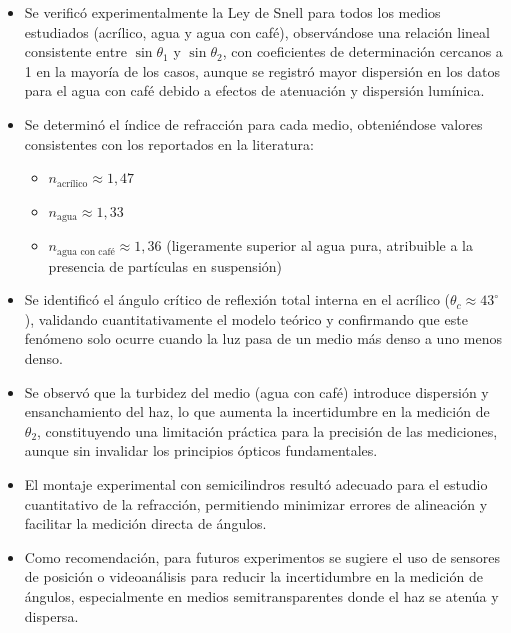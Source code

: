 \documentclass[11pt,twocolumn]{article}
\begin{document}
\begin{itemize}
    \item Se verificó experimentalmente la Ley de Snell para todos los medios estudiados (acrílico, agua y agua con café), observándose una relación lineal consistente entre $\sin\theta_1$ y $\sin\theta_2$, con coeficientes de determinación cercanos a 1 en la mayoría de los casos, aunque se registró mayor dispersión en los datos para el agua con café debido a efectos de atenuación y dispersión lumínica.

    \item Se determinó el índice de refracción para cada medio, obteniéndose valores consistentes con los reportados en la literatura:
    \begin{itemize}
        \item $n_{\text{acrílico}} \approx 1,47$
        \item $n_{\text{agua}} \approx 1,33$ 
        \item $n_{\text{agua con café}} \approx 1,36$ (ligeramente superior al agua pura, atribuible a la presencia de partículas en suspensión)
    \end{itemize}

    \item Se identificó el ángulo crítico de reflexión total interna en el acrílico ($\theta_c \approx 43^\circ$), validando cuantitativamente el modelo teórico y confirmando que este fenómeno solo ocurre cuando la luz pasa de un medio más denso a uno menos denso.

    \item Se observó que la turbidez del medio (agua con café) introduce dispersión y ensanchamiento del haz, lo que aumenta la incertidumbre en la medición de $\theta_2$, constituyendo una limitación práctica para la precisión de las mediciones, aunque sin invalidar los principios ópticos fundamentales.

    \item El montaje experimental con semicilindros resultó adecuado para el estudio cuantitativo de la refracción, permitiendo minimizar errores de alineación y facilitar la medición directa de ángulos.

    \item Como recomendación, para futuros experimentos se sugiere el uso de sensores de posición o videoanálisis para reducir la incertidumbre en la medición de ángulos, especialmente en medios semitransparentes donde el haz se atenúa y dispersa.
\end{itemize}

\newpage{}
\onecolumn{}
\printbibliography
\end{document}
